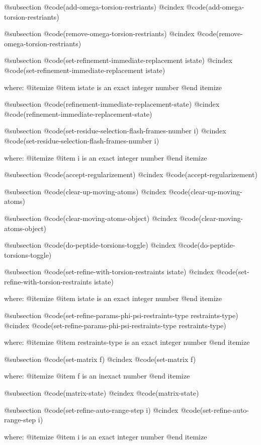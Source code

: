 @subsection @code{(add-omega-torsion-restriants)}
@cindex @code{(add-omega-torsion-restriants)}
 
@subsection @code{(remove-omega-torsion-restriants)}
@cindex @code{(remove-omega-torsion-restriants)}
 
@subsection @code{(set-refinement-immediate-replacement istate)}
@cindex @code{(set-refinement-immediate-replacement istate)}
 
where: 
 @itemize 
     @item istate is an exact integer number
 @end itemize


@subsection @code{(refinement-immediate-replacement-state)}
@cindex @code{(refinement-immediate-replacement-state)}
 
@subsection @code{(set-residue-selection-flash-frames-number i)}
@cindex @code{(set-residue-selection-flash-frames-number i)}
 
where: 
 @itemize 
     @item i is an exact integer number
 @end itemize


@subsection @code{(accept-regularizement)}
@cindex @code{(accept-regularizement)}
 
@subsection @code{(clear-up-moving-atoms)}
@cindex @code{(clear-up-moving-atoms)}
 
@subsection @code{(clear-moving-atoms-object)}
@cindex @code{(clear-moving-atoms-object)}
 
@subsection @code{(do-peptide-torsions-toggle)}
@cindex @code{(do-peptide-torsions-toggle)}
 
@subsection @code{(set-refine-with-torsion-restraints istate)}
@cindex @code{(set-refine-with-torsion-restraints istate)}
 
where: 
 @itemize 
     @item istate is an exact integer number
 @end itemize


@subsection @code{(set-refine-params-phi-psi-restraints-type restraints-type)}
@cindex @code{(set-refine-params-phi-psi-restraints-type restraints-type)}
 
where: 
 @itemize 
     @item restraints-type is an exact integer number
 @end itemize


@subsection @code{(set-matrix f)}
@cindex @code{(set-matrix f)}
 
where: 
 @itemize 
     @item f is an inexact number
 @end itemize


@subsection @code{(matrix-state)}
@cindex @code{(matrix-state)}
 
@subsection @code{(set-refine-auto-range-step i)}
@cindex @code{(set-refine-auto-range-step i)}
 
where: 
 @itemize 
     @item i is an exact integer number
 @end itemize



